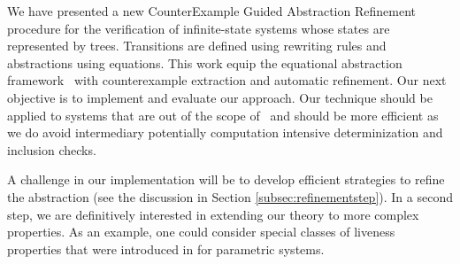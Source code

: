   We have presented a new CounterExample Guided Abstraction Refinement
  procedure for the verification of infinite-state systems whose
  states are represented by trees. Transitions are defined using
  rewriting rules and abstractions using equations. This work equip
  the equational abstraction framework~\cite{MeseguerPM-TCS08} with
  counterexample extraction and automatic refinement. Our next
  objective is to implement and evaluate our approach. Our technique
  should be applied to systems that are out of the scope
  of~\cite{BCHK08,BHRV06a} and should be more efficient as we do avoid
  intermediary potentially computation intensive determinization and
  inclusion checks.

A challenge in our implementation will be to develop efficient
strategies to refine the abstraction (see the discussion in Section
\ref{subsec:refinementstep}). In a second step, we are definitively
interested in extending our theory to more complex properties. As an
example, one could consider special classes of liveness properties
that were introduced in \cite{BLW04b} for parametric systems.
  